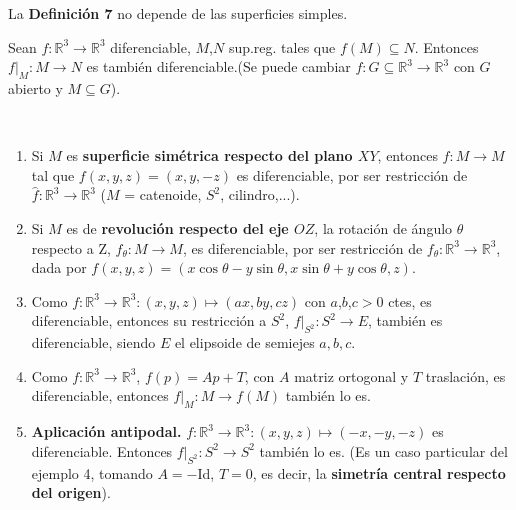 \documentclass[twoside]{report}
\begin{document}
\begin{prop}
La \textup{\textbf{Definición 7}} no depende de las superficies simples.
\end{prop}

\begin{teorema}
Sean  $f: \mathbb{R}^3 \rightarrow \mathbb{R}^3$ diferenciable, $M$,$N$ sup.reg. tales que $f(M) \subseteq N$. Entonces $f\vert_M : M \rightarrow N$ es también diferenciable.(Se puede cambiar $f: G \subseteq \mathbb{R}^3 \rightarrow \mathbb{R}^3$ con $G$ abierto y $M\subseteq G$).
\end{teorema}

\begin{ej}

\

\begin{enumerate}
\item
Si $M$ es \textbf{superficie simétrica respecto del plano $XY$}, entonces $f: M \rightarrow M$ tal que $f(x,y,z)=(x,y,-z)$ es diferenciable, por ser restricción de $\widehat{f} : \mathbb{R}^3 \rightarrow \mathbb{R}^3$ ($M$ = catenoide, $S^2$, cilindro,...).

\item Si $M$ es de \textbf{revolución respecto del eje $OZ$}, la rotación de ángulo $\theta$ respecto a Z, $f_{\theta}: M\rightarrow M$, es diferenciable, por ser restricción de $f_{\theta}: \mathbb{R}^3 \rightarrow \mathbb{R}^3$, dada por $f(x,y,z)=(x\cos\theta - y\sin\theta, x\sin\theta+ y\cos\theta,z)$.

\item
Como $f: \mathbb{R}^3 \rightarrow \mathbb{R}^3:(x,y,z)\longmapsto(ax,by,cz)$ con $a$,$b$,$c >0$ ctes, es diferenciable, entonces su restricción a $S^2$, $f\vert_{S^2}: S^2 \rightarrow E$, también es diferenciable, siendo $E$ el elipsoide de semiejes $a,b,c$.

\item
Como $f: \mathbb{R}^3 \rightarrow \mathbb{R}^3$, $f(p)= Ap + T$, con $A$ matriz ortogonal y $T$ traslación, es diferenciable, entonces $f\vert_{M}: M \rightarrow f(M)$ también lo es.

\item \textbf{Aplicación antipodal.}
$f: \mathbb{R}^3 \rightarrow \mathbb{R}^3:(x,y,z) \longmapsto (-x,-y,-z)$ es diferenciable. Entonces $f\vert_{S^2}: S^2 \rightarrow S^2$ también lo es. (Es un caso particular del ejemplo 4, tomando $A= -$Id, $T=0$, es decir, la \textbf{simetría central respecto del origen}).
\end{enumerate}
\end{ej}
\end{document}
